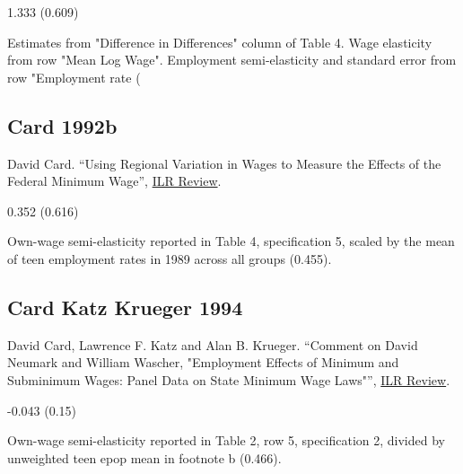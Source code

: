 \vspace{0.7em}

 1.333 (0.609)

\vspace{0.7em}

 Estimates from "Difference in Differences" column of Table 4. Wage elasticity from row "Mean Log Wage". Employment semi-elasticity and standard error from row "Employment rate (%

\subsection*{Card 1992b}
\vspace{-0.7em}

\noindent David Card. ``Using Regional Variation in Wages to Measure the Effects of the Federal Minimum Wage'', \href{https://doi.org/10.1177/001979399204600103}{ILR Review}.

\vspace{0.7em}

 0.352 (0.616)

\vspace{0.7em}

 Own-wage semi-elasticity reported in Table 4, specification 5, scaled by the mean of teen employment rates in 1989 across all groups (0.455).

\subsection*{Card Katz Krueger 1994}
\vspace{-0.7em}

\noindent David Card, Lawrence F. Katz and Alan B. Krueger. ``Comment on David Neumark and William Wascher, "Employment Effects of Minimum and Subminimum Wages: Panel Data on State Minimum Wage Laws"'', \href{https://doi.org/10.1177/001979399404700308}{ILR Review}.

\vspace{0.7em}

 -0.043 (0.15)

\vspace{0.7em}

 Own-wage semi-elasticity reported in Table 2, row 5, specification 2, divided by unweighted teen epop mean in footnote b (0.466).

